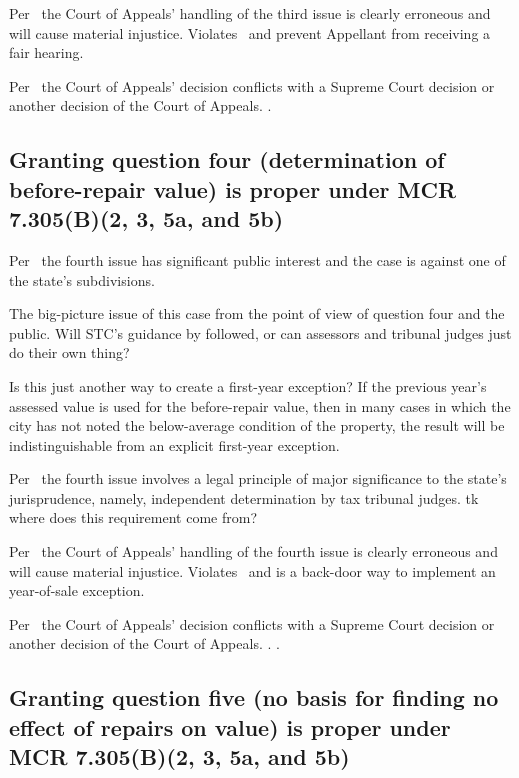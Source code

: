 \documentclass[12pt,\documentclassflag]{michiganCourtOfAppealsBrief}
\begin{document}
Per \cite{MCR 7.305(B)(5a)}\ the Court of Appeals' handling of the third issue is clearly erroneous and will cause material injustice. Violates \cite{Jones & Laughlin}\ and prevent Appellant from receiving a fair hearing.

Per \cite{MCR 7.305(B)(5b)}\ the Court of Appeals' decision conflicts with a Supreme Court decision or another decision of the Court of Appeals. \cite{Jones & Laughlin}.

\subsection{Granting question four (determination of before-repair value) is proper under MCR 7.305(B)(2, 3, 5a, and 5b)}

Per \cite{MCR 7.305(B)(2)}\ the fourth issue has significant public interest and the case is against one of the state's subdivisions.

The big-picture issue of this case from the point of view of question four and the public. Will STC's guidance by followed, or can assessors and tribunal judges just do their own thing?

Is this just another way to create a first-year exception? If the previous year's assessed value is used for the before-repair value, then in many cases in which the city has not noted the below-average condition of the property, the result will be indistinguishable from an explicit first-year exception. 

Per \cite{MCR 7.305(B)(3)}\ the fourth issue involves a legal principle of major significance to the state's jurisprudence, namely, independent determination by tax tribunal judges. tk where does this requirement come from?

Per \cite{MCR 7.305(B)(5a)}\ the Court of Appeals' handling of the fourth  issue is clearly erroneous and will cause material injustice. Violates \cite{Jones & Laughlin}\ and is a back-door way to implement an year-of-sale exception.

Per \cite{MCR 7.305(B)(5b)}\ the Court of Appeals' decision conflicts with a Supreme Court decision or another decision of the Court of Appeals. \cite{Jones & Laughlin}. \cite{Jones & Laughlin}.

\subsection{Granting question five (no basis for finding no effect of repairs on value) is proper under MCR 7.305(B)(2, 3, 5a, and 5b)}
\end{document}

